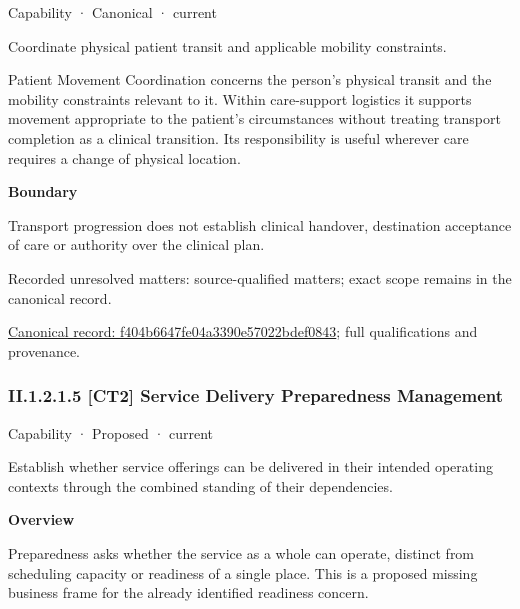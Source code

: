 \label{element:f404b6647fe04a3390e57022bdef0843}
{\small Capability · Canonical · current}\par

Coordinate physical patient transit and applicable mobility constraints.



Patient Movement Coordination concerns the person's physical transit and the mobility constraints relevant to it. Within care-support logistics it supports movement appropriate to the patient's circumstances without treating transport completion as a clinical transition. Its responsibility is useful wherever care requires a change of physical location.



\textbf{Boundary}



Transport progression does not establish clinical handover, destination acceptance of care or authority over the clinical plan.


{\small Recorded unresolved matters: source-qualified matters; exact scope remains in the canonical record.}\par
{\footnotesize \href{../../../../continuum/strategy/capability/f404b6647fe04a3390e57022bdef0843.md}{Canonical record: f404b6647fe04a3390e57022bdef0843}; full qualifications and provenance.}\par
\subsubsection*{II.1.2.1.5 [CT2] Service Delivery Preparedness Management}
\label{navigation:II.1.2.1.5}

\label{element:9665d894c4c9438999d8cc10afae695d}
{\small Capability · Proposed · current}\par

Establish whether service offerings can be delivered in their intended operating contexts through the combined standing of their dependencies.



\textbf{Overview}



Preparedness asks whether the service as a whole can operate, distinct from scheduling capacity or readiness of a single place. This is a proposed missing business frame for the already identified readiness concern.



